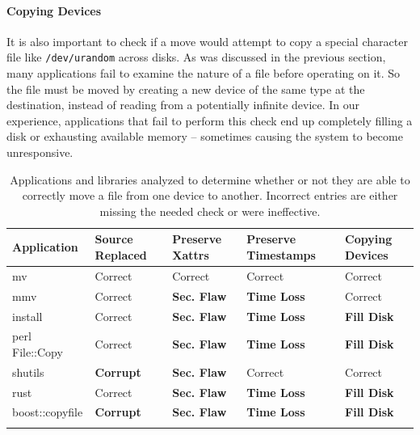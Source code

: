 \paragraph{Copying Devices}

It is also important to check if a move would attempt to copy a special
character file like {\tt /dev/urandom} across disks.  As was discussed in the
previous section, many applications fail to examine the nature of a file before
operating on it.  So the file must be moved by creating a new device of the same
type at the destination, instead of reading from a potentially infinite device.
In our experience, applications that fail to perform this check end up
completely filling a disk or exhausting available memory -- sometimes causing the
system to become unresponsive.


 \begin{table}[t]
    \scriptsize{}
    \begin{tabular}{l p{1cm} p{1cm} p{1.2cm} p{1cm}}
    \toprule{}
        Application     & Source Replaced & Preserve Xattrs & Preserve Timestamps & Copying Devices\\
\hline
        mv              & Correct             & Correct         & Correct             & Correct\\
        mmv             & Correct             & {\bf Sec. Flaw} & {\bf Time
Loss} & Correct\\
        install         & Correct             & {\bf Sec. Flaw} & {\bf Time
Loss} & {\bf Fill Disk} \\
        perl File::Copy & Correct             & {\bf Sec. Flaw} & {\bf Time
Loss} & {\bf Fill Disk} \\
        shutils         & {\bf Corrupt}	& {\bf Sec. Flaw} 	& Correct             & Correct\\
        rust            & Correct             & {\bf Sec. Flaw} & {\bf Time
Loss} & {\bf Fill Disk} \\
        boost::copyfile & {\bf Corrupt}	      & {\bf Sec. Flaw} & {\bf Time
Loss} & {\bf Fill Disk} \\
    \bottomrule{}
    \end{tabular}
    \caption{Applications and libraries analyzed to determine whether or not
      they are able to correctly move a file from one device to another.
Incorrect entries are either missing the needed check or were ineffective.}
    \label{table:crossdevice}
\end{table}

